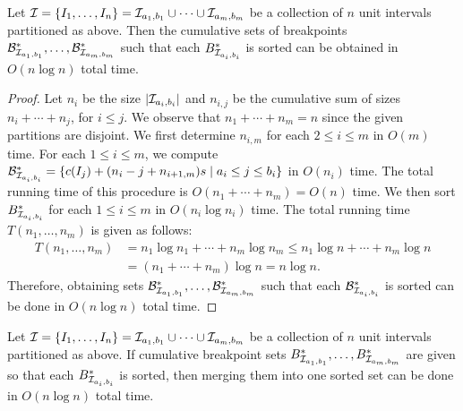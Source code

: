 \begin{mlemmarep}\label{lem:breakpoint_sort}
    Let $\mathcal{I} = \{I_1,\ldots,I_n\} = \mathcal{I}_{a_1,b_1}\cup\cdots\cup\mathcal{I}_{a_{m},b_{m}}$ be a collection of $n$ unit intervals partitioned as above. %
    Then the cumulative sets of breakpoints $\mathcal{B}^*_{\mathcal{I}_{a_1,b_1}},\ldots,\mathcal{B}^*_{\mathcal{I}_{a_m,b_m}}$ such that each $B^*_{\mathcal{I}_{a_i,b_i}}$ is sorted can be obtained in $O(n\log n)$ total time.
\end{mlemmarep}
\begin{proof}
    Let $n_i$ be the size $|\mathcal{I}_{a_i,b_i}|$ and $n_{i,j}$ be the cumulative sum of sizes $n_i+\cdots+n_j$, for $i\le j$.
    We observe that $n_1+\cdots+n_m = n$ since the given partitions are disjoint.
    We first determine $n_{i,m}$ for each $2\le i \le m$ in $O(m)$ time.
    For each $1\le i \le m$, we compute $\mathcal{B}^*_{\mathcal{I}_{a_i,b_i}} = \{c(I_j)+(n_i-j + n_{i+1,m})s\mid a_i\le j \le b_i\}$ in $O(n_i)$ time.
    The total running time of this procedure is $O(n_1+\cdots+n_m) = O(n)$ time.
    We then sort $B^*_{\mathcal{I}_{a_i,b_i}}$ for each $1\le i \le m$ in $O(n_i \log n_i)$ time. The total running time $T(n_1,\ldots,n_m)$ is given as follows:
    \begin{align*}
        T(n_1,\ldots,n_m) & = n_1 \log n_1 + \cdots + n_m\log n_m\le n_1\log{n} + \cdots +n_m\log{n}\\
        &= (n_1+\cdots+n_m)\log{n}= n \log{n}.
    \end{align*}
    Therefore, obtaining sets $\mathcal{B}^*_{\mathcal{I}_{a_1,b_1}},\ldots,\mathcal{B}^*_{\mathcal{I}_{a_m,b_m}}$ such that each $\mathcal{B}^*_{\mathcal{I}_{a_i,b_i}}$ is sorted can be done in $O(n\log n)$ total time.
\end{proof}
\begin{mlemmarep}\label{lem:total_merge_complexity}
    Let $\mathcal{I} = \{I_1,\ldots,I_n\} = \mathcal{I}_{a_1,b_1}\cup\cdots\cup\mathcal{I}_{a_{m},b_{m}}$ be a collection of $n$ unit intervals partitioned as above.
    If cumulative breakpoint sets $B^*_{\mathcal{I}_{a_1,b_1}},\ldots,B^*_{\mathcal{I}_{a_m,b_m}}$ are given so that each $B^*_{\mathcal{I}_{a_i,b_i}}$ is sorted, then merging them into one sorted set can be done in $O(n\log n)$ total time.
\end{mlemmarep}
